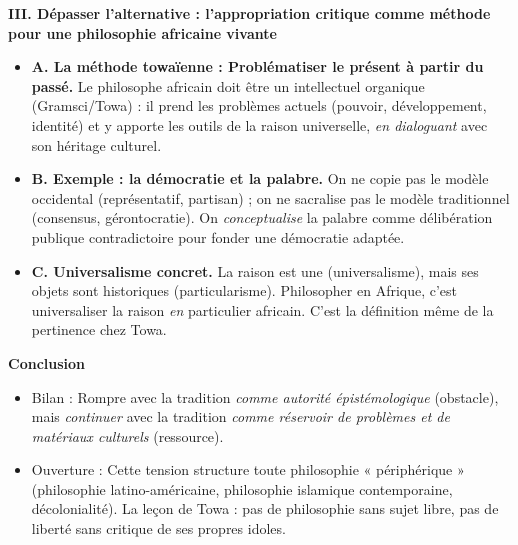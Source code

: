 \documentclass[11pt]{article}
\newcommand{\cle}[1]{{\popxbold\color{popdark}#1}}
\begin{document}
\begin{exoresolu}
\textbf{III. Dépasser l'alternative : l'appropriation critique comme méthode pour une philosophie africaine vivante}
\begin{itemize}
    \item \textbf{A. La méthode towaïenne : Problématiser le présent à partir du passé.} Le philosophe africain doit être un \guillemotleft intellectuel organique \guillemotright (Gramsci/Towa) : il prend les problèmes actuels (pouvoir, développement, identité) et y apporte les outils de la raison universelle, \emph{en dialoguant} avec son héritage culturel.
    \item \textbf{B. Exemple : la démocratie et la palabre.} On ne copie pas le modèle occidental (représentatif, partisan) ; on ne sacralise pas le modèle traditionnel (consensus, gérontocratie). On \emph{conceptualise} la palabre comme \cle{délibération publique contradictoire} pour fonder une démocratie adaptée.
    \item \textbf{C. Universalisme concret.} La raison est une (universalisme), mais ses objets sont historiques (particularisme). Philosopher en Afrique, c'est universaliser la raison \emph{en} particulier africain. C'est la définition même de la \cle{pertinence} chez Towa.
\end{itemize}

\textbf{Conclusion}
\begin{itemize}
    \item Bilan : Rompre avec la tradition \emph{comme autorité épistémologique} (obstacle), mais \emph{continuer} avec la tradition \emph{comme réservoir de problèmes et de matériaux culturels} (ressource).
    \item Ouverture : Cette tension structure toute philosophie « périphérique » (philosophie latino-américaine, philosophie islamique contemporaine, décolonialité). La leçon de Towa : pas de philosophie sans \cle{sujet} libre, pas de liberté sans \cle{critique} de ses propres idoles.
\end{itemize}
\end{exoresolu}
\end{document}
